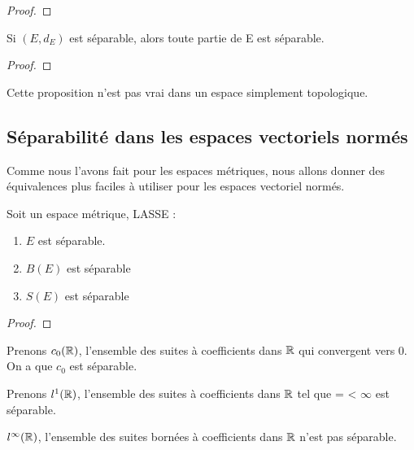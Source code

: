 \begin{proof}
	
\end{proof}

\begin{proposition}
	Si $(E, d_{E})$ est séparable, alors toute partie de E est séparable.
\end{proposition}

\begin{proof}
	
\end{proof}

\begin{remarque}
	Cette proposition n'est pas vrai dans un espace simplement topologique.
\end{remarque}

\subsection{Séparabilité dans les espaces vectoriels normés}

Comme nous l'avons fait pour les espaces métriques, nous allons donner des
équivalences plus faciles à utiliser pour les espaces vectoriel normés.

\begin{proposition}
	Soit  un espace métrique, LASSE :
	\begin{enumerate}
		\item $E$ est séparable.
		\item $B(E)$ est séparable
		\item $S(E)$ est séparable
	\end{enumerate}
\end{proposition}

\begin{proof}
	
\end{proof}

\begin{exemple}
	Prenons $c_{0}(\mathbb{R})$, l'ensemble des suites à coefficients dans $\mathbb{R}$
	qui convergent vers 0. On a que $c_{0}$ est séparable.
\end{exemple}

\begin{exemple}
	Prenons $l^{1}(\mathbb{R})$, l'ensemble des suites à coefficients dans $\mathbb{R}$
	tel que  =  < $\infty$ est
	séparable.
\end{exemple}

\begin{exemple}
	$l^{\infty}(\mathbb{R})$, l'ensemble des suites bornées à coefficients dans
	$\mathbb{R}$ n'est pas séparable.
\end{exemple}

